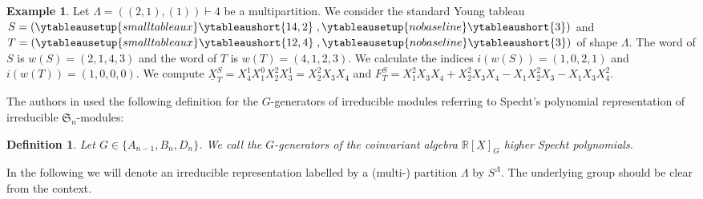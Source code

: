 \documentclass[11pt,a4paper]{amsart}
\numberwithin{equation}{section}
\newtheorem{definition}[thm]{Definition}
\theoremstyle{definition}
\newtheorem{example}[thm]{Example}
\newcommand{\R}{\mathbb{R}}
\numberwithin{thm}{section}
\theoremstyle{break}
\numberwithin{subcase}{case}
\begin{document}
 
\begin{example}
Let $\Lambda = ((2,1),(1)) \vdash 4$ be a multipartition. We consider the standard Young tableau $S= \left( \ytableausetup{smalltableaux}
  \ytableaushort{
   14,2}\; ,
  \ytableausetup{nobaseline}
  \ytableaushort{
   3} \right) $ and $T=\left( \ytableausetup{smalltableaux}
  \ytableaushort{
   12,4}\; ,
  \ytableausetup{nobaseline}
  \ytableaushort{
   3} \right)$ of shape $\Lambda$.
The word of $S$ is $w(S)=(2,1,4,3)$ and the word of $T$ is $w(T) = (4,1,2,3)$. We calculate the indices $i(w(S))=(1,0,2,1)$ and $i(w(T))=(1,0,0,0)$. We compute $\underline{X}_T^S=X_4^1X_1^0X_2^2X_3^1=X_2^2X_3X_4$ and $F_T^S=X_1^2X_3X_4+X_2^2X_3X_4-X_1X_2^2X_3-X_1X_3X_4^2$.
\end{example}
The authors in \cite{morita1998higher} used the following definition for the $G$-generators of irreducible modules referring to Specht's polynomial representation of irreducible $\mathfrak{S}_n$-modules:
\begin{definition}
Let $G \in \{ A_{n-1},B_n,D_n\}$. We call the $G$-generators of the coinvariant algebra $\R[\underline{X}]_G$ higher Specht polynomials. 
\end{definition}
In the following we will denote an irreducible representation labelled by a (multi-) partition $\Lambda$ by $S^\Lambda$. The underlying group should be clear from the context.
\end{document}
